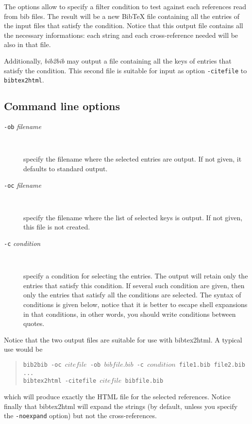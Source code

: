 \documentclass[11pt,a4paper]{article}
\begin{document}
The options allow to specify a filter condition to test against each
references read from bib files. The result will be a new BibTeX file
containing all the entries of the input files that satisfy the
condition. Notice that this output file contains all the necessary
informations: each string and each cross-reference needed will be also
in that file.

Additionally, \textit{bib2bib} may output a file containing all the
keys of entries that satisfy the condition. This second file is
suitable for input as option \verb|-citefile| to \verb|bibtex2html|.

\subsection{Command line options}

\begin{description}
  
\item[\texttt{-ob} \textit{filename}] ~

  specify the filename where the selected entries are output. If not
  given, it defaults to standard output. 

\item[\texttt{-oc} \textit{filename}] ~

  specify the filename where the list of selected keys is output. If
  not given, this file is not created.

\item[\texttt{-c} \textit{condition}] ~

  specify a condition for selecting the entries. The output will
  retain only the entries that satisfy this condition. If several such
  condition are given, then only the entries that satisfy all the
  conditions are selected. The syntax of conditions is given below,
  notice that it is better to escape shell expansions in that
  conditions, in other words, you should write conditions between
  quotes. 

\end{description}

Notice that the two output files are suitable for use with
bibtex2html.  A typical use would be
\begin{quote}
\texttt{bib2bib -oc $citefile$ -ob $bibfile.bib$ -c $condition$
  file1.bib file2.bib ... } \\
\texttt{bibtex2html -citefile $citefile$ bibfile.bib}
\end{quote}
which will produce exactly the HTML file for the selected
references. Notice finally that bibtex2html will expand the strings
(by default, unless you specify the \verb|-noexpand| option) but not
the cross-references.
\end{document}
